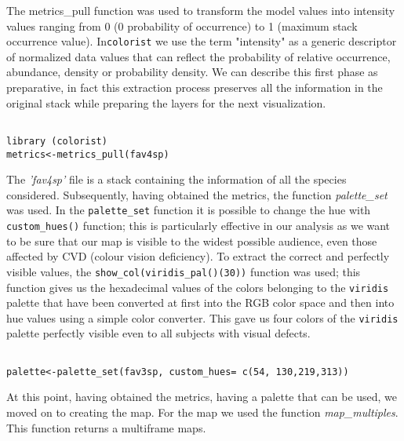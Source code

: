 \documentclass[12pt,a4paper]{article}
\begin{document}
The metrics\_pull function was used to transform the model values into intensity values ranging from 0 (0 probability of occurrence) to 1 (maximum stack occurrence value).
  In\texttt{colorist} we use the term "intensity" as a generic descriptor of normalized data values that can reflect the probability of relative occurrence, abundance, density or probability density.\citep{colo}
We can describe this first phase as preparative, in fact this extraction process preserves all the information in the original stack while preparing the layers for the next visualization.

\begin{lstlisting}

library (colorist)
metrics<-metrics_pull(fav4sp) 

\end{lstlisting}

\bigskip
The \textit{'fav4sp'} file is a stack containing the information of all the species considered.
Subsequently, having obtained the metrics, the function \textit{palette\_set} was used.
In the \texttt{palette\_set} function it is possible to change the hue with \texttt{custom\_hues()} function; this is particularly effective in our analysis as we want to be sure that our map is visible to the widest possible audience, even those affected by CVD (colour vision deficiency).
To extract the correct and perfectly visible values, the \texttt{show\_col(viridis\_pal()(30))} function was used; this function gives us the hexadecimal values of the colors belonging to the \texttt{viridis} palette that have been converted at first into the RGB color space and then into hue values using a simple color converter. This gave us four colors of the \texttt{viridis} palette perfectly visible even to all subjects with visual defects.
\begin{lstlisting}

palette<-palette_set(fav3sp, custom_hues= c(54, 130,219,313))
\end{lstlisting}

\bigskip
At this point, having obtained the metrics, having a palette that can be used, we moved on to creating the map.
For the map we used the function \textit{map\_multiples}.
This function returns a multiframe maps.
\end{document}
